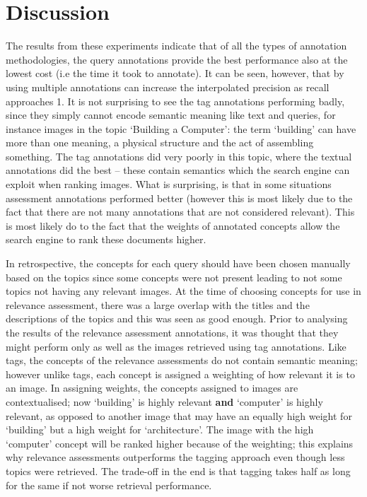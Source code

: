 \chapter{Discussion}

The results from these experiments indicate that of all the types of annotation methodologies, the query annotations provide the best performance also at the lowest cost (i.e the time it took to annotate). It can be seen, however, that by using multiple annotations can increase the interpolated precision as recall approaches 1. It is not surprising to see the tag annotations performing badly, since they simply cannot encode semantic meaning like text and queries, for instance images in the topic `Building a Computer': the term `building' can have more than one meaning, a physical structure and the act of assembling something. The tag annotations did very poorly in this topic, where the textual annotations did the best -- these contain semantics which the search engine can exploit when ranking images.  What is surprising, is that in some situations assessment annotations performed better (however this is most likely due to the fact that there are not many annotations that are not considered relevant). This is most likely do to the fact that the weights of annotated concepts allow the search engine to rank these documents higher. 

In retrospective, the concepts for each query should have been chosen manually based on the topics since some concepts were not present leading to not some topics not having any relevant images. At the time of choosing concepts for use in relevance assessment, there was a large overlap with the titles and the descriptions of the topics and this was seen as good enough. Prior to analysing the results of the relevance assessment annotations, it was thought that they might perform only as well as the images retrieved using tag annotations. Like tags, the concepts of the relevance assessments do not contain semantic meaning; however unlike tags, each concept is assigned a weighting of how relevant it is to an image. In assigning weights, the concepts assigned to images are contextualised; now `building' is highly relevant \textbf{and} `computer' is highly relevant, as opposed to another image that may have an equally high weight for `building' but a high weight for `architecture'. The image with the high `computer' concept will be ranked higher because of the weighting; this explains why relevance assessments outperforms the tagging approach even though less topics were retrieved. The trade-off in the end is that tagging takes half as long for the same if not worse retrieval performance.

